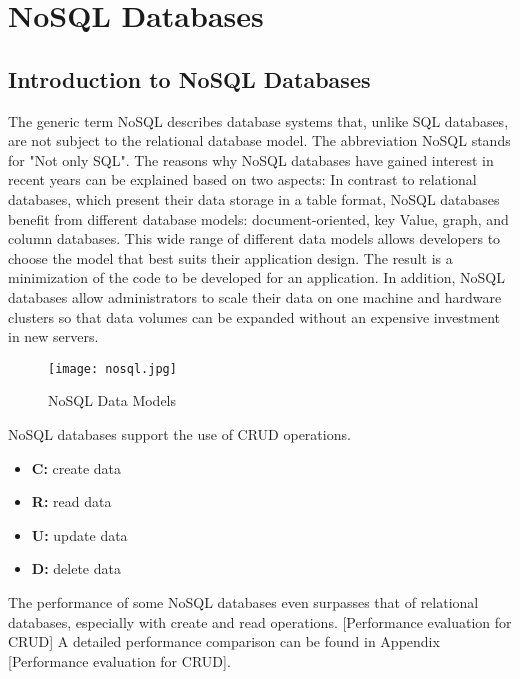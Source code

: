 \section{NoSQL Databases}

\subsection{Introduction to NoSQL Databases}
The generic term NoSQL describes database systems that, unlike SQL databases, are not subject to the relational database model. The abbreviation NoSQL stands for "Not only SQL". The reasons why NoSQL databases have gained interest in recent years can be explained based on two aspects: In contrast to relational databases, which present their data storage in a table format, NoSQL databases benefit from different database models: document-oriented, key Value, graph, and column databases. This wide range of different data models allows developers to choose the model that best suits their application design. The result is a minimization of the code to be developed for an application. In addition, NoSQL databases allow administrators to scale their data on one machine and hardware clusters so that data volumes can be expanded without an expensive investment in new servers.
\begin{figure}[H]
	\centering
	\texttt{[image: nosql.jpg]}
	\caption[NoSQL Data Models]{NoSQL Data Models}
\end{figure}

NoSQL databases support the use of CRUD operations.
\begin{itemize}
	\item \textbf{C:} create data
	\item \textbf{R:} read data
	\item \textbf{U:} update data
	\item \textbf{D:} delete data
\end{itemize}
The performance of some NoSQL databases even surpasses that of relational databases, especially with create and read operations. [Performance evaluation for CRUD] A detailed  performance comparison can be found in Appendix [Performance evaluation for CRUD].
